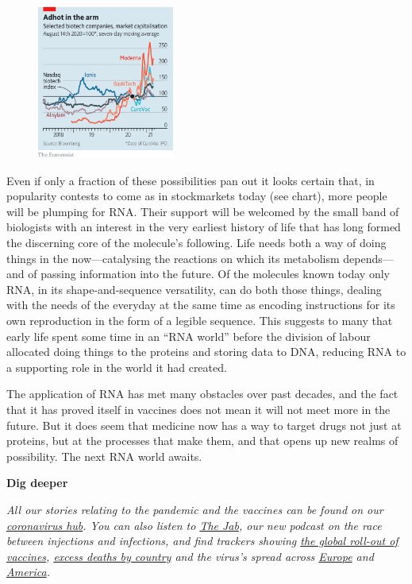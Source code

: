 \documentclass{article}
\begin{document}
\begin{figure}[h]
\centering
\includegraphics[width=0.4\textwidth]{images/20210327_fbc310.png}
\end{figure}


Even if only a fraction of these possibilities pan out it looks certain that, in popularity contests to come as in stockmarkets today (see chart), more people will be plumping for RNA. Their support will be welcomed by the small band of biologists with an interest in the very earliest history of life that has long formed the discerning core of the molecule's following. Life needs both a way of doing things in the now---catalysing the reactions on which its metabolism depends---and of passing information into the future. Of the molecules known today only RNA, in its shape-and-sequence versatility, can do both those things, dealing with the needs of the everyday at the same time as encoding instructions for its own reproduction in the form of a legible sequence. This suggests to many that early life spent some time in an ``RNA world'' before the division of labour allocated doing things to the proteins and storing data to DNA, reducing RNA to a supporting role in the world it had created. 

The application of RNA has met many obstacles over past decades, and the fact that it has proved itself in vaccines does not mean it will not meet more in the future. But it does seem that medicine now has a way to target drugs not just at proteins, but at the processes that make them, and that opens up new realms of possibility. The next RNA world awaits. {} 

\textbf{Dig deeper} 

\emph{All our stories relating to the pandemic and the vaccines can be found on our \href{/news/2020/03/11/the-economists-coverage-of-the-coronavirus}{coronavirus hub}. You can also listen to \href{/podcasts/the-jab-a-new-podcast-from-the-economist}{The Jab}, our new podcast on the race between injections and infections, and find trackers showing \href{https://www.economist.com/graphic-detail/tracking-coronavirus-across-the-world}{the global roll-out of vaccines}, \href{https://www.economist.com/graphic-detail/coronavirus-excess-deaths-tracker}{excess deaths by country} and the virus's spread across \href{https://www.economist.com/graphic-detail/tracking-coronavirus-across-europe}{Europe} and \href{https://www.economist.com/graphic-detail/tracking-coronavirus-across-america}{America}.} 
\clearpage
\end{document}
